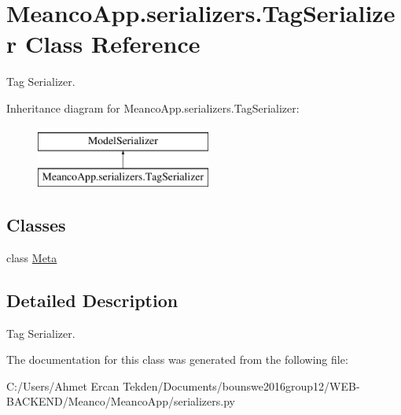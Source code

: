 \hypertarget{class_meanco_app_1_1serializers_1_1_tag_serializer}{}\section{Meanco\+App.\+serializers.\+Tag\+Serializer Class Reference}
\label{class_meanco_app_1_1serializers_1_1_tag_serializer}


Tag Serializer.  


Inheritance diagram for Meanco\+App.\+serializers.\+Tag\+Serializer\+:\begin{figure}[H]
\begin{center}
\leavevmode
\includegraphics[height=2.000000cm]{class_meanco_app_1_1serializers_1_1_tag_serializer}
\end{center}
\end{figure}
\subsection*{Classes}
\begin{DoxyCompactItemize}
\item 
class \hyperlink{class_meanco_app_1_1serializers_1_1_tag_serializer_1_1_meta}{Meta}
\end{DoxyCompactItemize}


\subsection{Detailed Description}
Tag Serializer. 

The documentation for this class was generated from the following file\+:\begin{DoxyCompactItemize}
\item 
C\+:/\+Users/\+Ahmet Ercan Tekden/\+Documents/bounswe2016group12/\+W\+E\+B-\/\+B\+A\+C\+K\+E\+N\+D/\+Meanco/\+Meanco\+App/serializers.\+py\end{DoxyCompactItemize}
